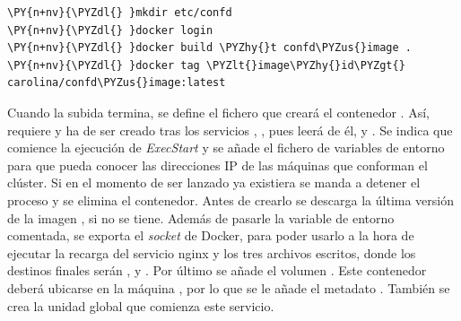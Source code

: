 \begin{framed_shaded}
\begin{Verbatim}[fontsize=\relsize{-2.5},fontseries=b,commandchars=\\\{\}]
\PY{n+nv}{\PYZdl{} }mkdir etc/confd
\PY{n+nv}{\PYZdl{} }docker login
\PY{n+nv}{\PYZdl{} }docker build \PYZhy{}t confd\PYZus{}image .
\PY{n+nv}{\PYZdl{} }docker tag \PYZlt{}image\PYZhy{}id\PYZgt{} carolina/confd\PYZus{}image:latest
\end{Verbatim}
\end{framed_shaded}

Cuando la subida termina, se define el fichero  que creará el contenedor . Así, requiere y ha de ser creado tras los servicios , , pues leerá de él, y . Se indica que comience la ejecución de \textit{ExecStart} y se añade el fichero de variables de entorno  para que pueda conocer las direcciones IP de las máquinas que conforman el clúster. Si en el momento de ser lanzado ya existiera se manda a detener el proceso y se elimina el contenedor. Antes de crearlo se descarga la última versión de la imagen , si no se tiene. Además de pasarle la variable de entorno comentada, se exporta el \textit{socket} de Docker, para poder usarlo a la hora de ejecutar la recarga del servicio nginx y los tres archivos escritos, donde los destinos finales serán ,  y . Por último se añade el volumen . Este contenedor deberá ubicarse en la máquina , por lo que se le añade el metadato . También se crea la unidad global  que comienza este servicio.

